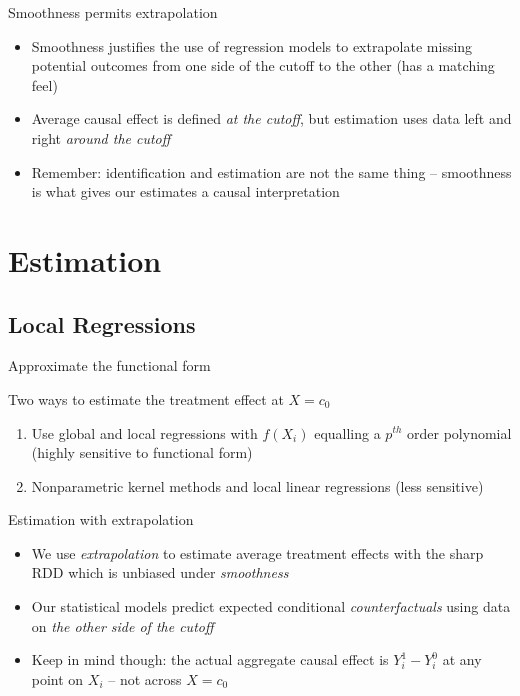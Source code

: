 \documentclass{beamer}
\begin{document}
\begin{frame}{Smoothness permits extrapolation}
	

	\begin{itemize}
	\item Smoothness justifies the use of regression models to extrapolate missing potential outcomes from one side of the cutoff to the other (has a matching feel)
	\item Average causal effect is defined \emph{at the cutoff}, but estimation uses data left and right \emph{around the cutoff} 
	\item Remember: identification and estimation are not the same thing -- smoothness is what gives our estimates a causal interpretation
	\end{itemize}
	
\end{frame}



\section{Estimation}

\subsection{Local Regressions}

\begin{frame}{Approximate the functional form}

Two ways to estimate the treatment effect at $X=c_0$

\bigskip

		\begin{enumerate}
		\item Use global and local regressions with $f(X_i)$ equalling a $p^{th}$ order polynomial (highly sensitive to functional form)
		\item Nonparametric kernel methods and local linear regressions (less sensitive)
		\end{enumerate}
\end{frame}


\begin{frame}{Estimation with extrapolation}
	
	\begin{itemize}
	\item We use \emph{extrapolation} to estimate average treatment effects with the sharp RDD which is unbiased under \emph{smoothness}
	\item Our statistical models predict expected conditional \emph{counterfactuals} using data on \emph{the other side of the cutoff}
	\item Keep in mind though: the actual aggregate causal effect is $Y^1_i - Y^0_i$ at any point on $X_i$ -- not across $X=c_0$
	
	\end{itemize}

\end{frame}
\end{document}
